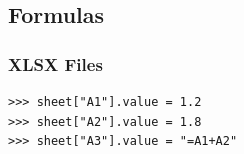 {\subsection{Formulas}
\begin{frame}[fragile]
  \frametitle{XLSX Files }
  \vspace{3mm}
  \begin{verbatim}
>>> sheet["A1"].value = 1.2
>>> sheet["A2"].value = 1.8
>>> sheet["A3"].value = "=A1+A2"
  \end{verbatim}
\end{frame}

}


